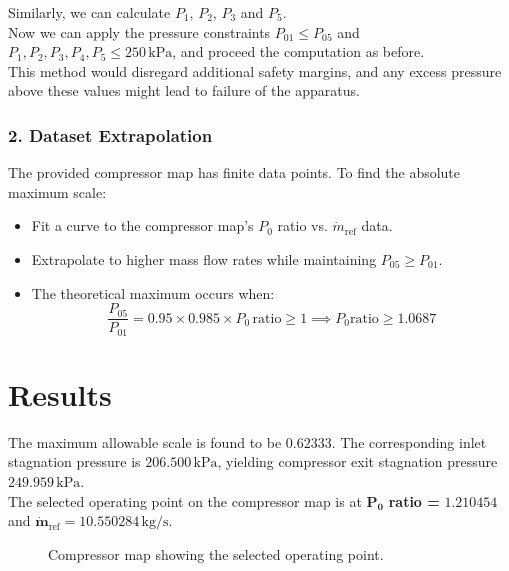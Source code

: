 \documentclass[12pt,a4paper]{article}
\begin{document}
Similarly, we can calculate $P_1$, $P_2$, $P_3$ and $P_5$.\\
Now we can apply the pressure constraints $P_{01} \leq P_{05}$ and $P_{1}, P_{2}, P_{3}, P_{4}, P_{5} \leq 250\,\mathrm{kPa}$, and proceed the computation as before.\\
This method would disregard additional safety margins, and any excess pressure above these values might lead to failure of the apparatus.

\subsubsection*{2. Dataset Extrapolation}
The provided compressor map has finite data points. To find the absolute maximum scale:
\begin{itemize}
  \item Fit a curve to the compressor map's $P_0$ ratio vs. $\dot{m}_{\mathrm{ref}}$ data.
  \item Extrapolate to higher mass flow rates while maintaining $P_{05} \geq P_{01}$.
  \item The theoretical maximum occurs when:
    \[
    \frac{P_{05}}{P_{01}} = 0.95 \times 0.985 \times P_0\,\mathrm{ratio} \geq 1 \implies P_0\mathrm{ratio} \geq 1.0687
    \]
\end{itemize}


\section*{Results}

The maximum allowable scale is found to be \(\mathbf{0.62333}\).  
The corresponding inlet stagnation pressure is \(\mathbf{206.500}\,\boldsymbol{\mathrm{kPa}}\), yielding compressor exit stagnation pressure \(\mathbf{249.959}\,\boldsymbol{\mathrm{kPa}}\).\\
The selected operating point on the compressor map is at \(\mathbf{P_0}\) \textbf{ratio = }\(\mathbf{1.210454}\) and \(\boldsymbol{\dot{m}_{\mathrm{ref}}} = \mathbf{10.550284}\,\boldsymbol{\mathrm{kg/s}}\).

\begin{figure}[h!]
  \centering
  \caption{Compressor map showing the selected operating point.}
  \label{fig:compressor_map}
\end{figure}
\end{document}
